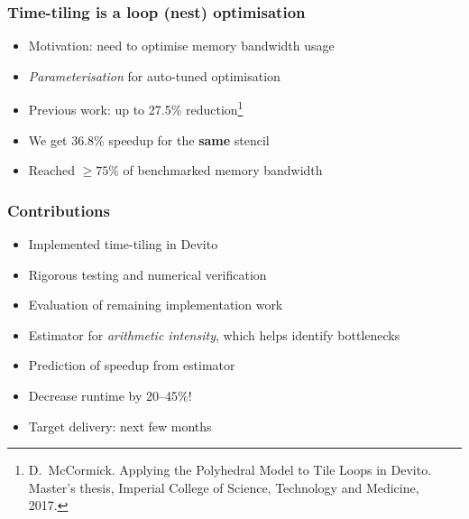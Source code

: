 \documentclass{beamer}
\begin{document}
%



\begin{frame}
\frametitle{Time-tiling is a loop (nest) optimisation}

\begin{itemize}
	\item Motivation: need to optimise memory bandwidth usage
	\item \emph{Parameterisation} for auto-tuned optimisation
	\newline
	\item Previous work: up to 27.5\% reduction\footnote{D.~McCormick. Applying the Polyhedral Model to Tile Loops in Devito. Master's thesis, Imperial College of Science, Technology and Medicine, 2017.}
	\item We get 36.8\% speedup for the \textbf{same} stencil
	\item Reached \(\ge 75\%\) of benchmarked memory bandwidth
\end{itemize}
\end{frame}



\begin{frame}
\frametitle{Contributions}

\begin{itemize}
	\item Implemented time-tiling in Devito
	\item Rigorous testing and numerical verification
	\item Evaluation of remaining implementation work
	\item Estimator for \emph{arithmetic intensity}, which helps identify bottlenecks
	\item Prediction of speedup from estimator
	\item Decrease runtime by 20--45\%!
	\newline
	\item Target delivery: next few months
\end{itemize}
\end{frame}
\end{document}
